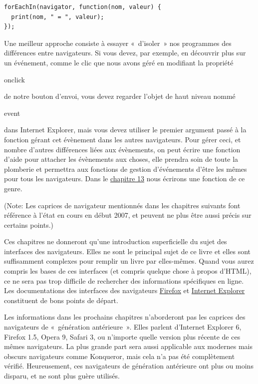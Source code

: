 \documentclass{FramateX}
\renewcommand{\texttt}[1]{\begin{sffamily}{#1}\end{sffamily}}
\begin{document}
\begin{lstlisting}
forEachIn(navigator, function(nom, valeur) {
  print(nom, " = ", valeur);
});
\end{lstlisting}
Une meilleur approche consiste à essayer «~d'isoler~» nos programmes des
différences entre navigateurs. Si vous devez, par exemple, en découvrir
plus sur un événement, comme le clic que nous avons géré en modifiant la
propriété \texttt{onclick} de notre bouton d'envoi, vous devez regarder
l'objet de haut niveau nommé \texttt{event} dans Internet Explorer, mais
vous devez utiliser le premier argument passé à la fonction gérant cet
évènement dans les autres navigateurs. Pour gérer ceci, et nombre
d'autres différences liées aux évènements, on peut écrire une fonction
d'aide pour attacher les évènements aux choses, elle prendra soin de
toute la plomberie et permettra aux fonctions de gestion d'événements
d'être les mêmes pour tous les navigateurs. Dans le
\href{chapter13.html}{chapitre 13} nous écrirons une fonction de ce
genre.

(Note: Les caprices de navigateur mentionnés dans les chapitres suivants
font référence à l'état en cours en début 2007, et peuvent ne plus être
aussi précis sur certains points.)

\begin{center}\end{center}

Ces chapitres ne donneront qu'une introduction superficielle du sujet
des interfaces des navigateurs. Elles ne sont le principal sujet de ce
livre et elles sont suffisamment complexes pour remplir un livre par
elles-mêmes. Quand vous aurez compris les bases de ces interfaces (et
compris quelque chose à propos d'HTML), ce ne sera pas trop difficile de
rechercher des informations spécifiques en ligne. Les documentations des
interfaces des navigateurs
\href{http://www.mozilla.org/docs/dom/domref/dom\_shortTOC.html}{Firefox}
et \href{http://msdn2.microsoft.com/library/yek4tbz0p.aspx}{Internet
Explorer} constituent de bons points de départ.

Les informations dans les prochains chapitres n'aborderont pas les
caprices des navigateurs de «~génération antérieure~». Elles parlent
d'Internet Explorer 6, Firefox 1.5, Opera 9, Safari 3, ou n'importe
quelle version plus récente de ces mêmes navigateurs. La plus grande
part sera aussi applicable aux modernes mais obscurs navigateurs comme
Konqueror, mais cela n'a pas été complètement vérifié. Heureusement, ces
navigateurs de génération antérieure ont plus ou moins disparu, et ne
sont plus guère utilisés.
\end{document}
